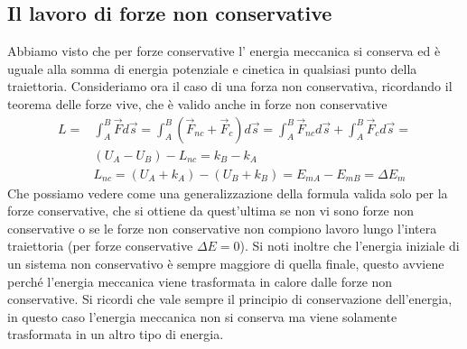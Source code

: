 \subsection{Il lavoro di forze non conservative}
Abbiamo visto che per forze conservative l' energia meccanica si conserva ed è uguale alla somma di energia potenziale e cinetica in qualsiasi punto della traiettoria. Consideriamo ora il caso di una forza non conservativa, ricordando il teorema delle forze vive, che è valido anche in forze non conservative
\begin{align*}
	L =& \int_{A}^{B} \vec{F} d\vec{s} = \int_{A}^{B} (\vec{F}_{nc}+\vec{F}_{c}) d\vec{s} = \int_{A}^{B} \vec{F}_{nc} d\vec{s} + \int_{A}^{B} \vec{F}_{c} d\vec{s} =\\
	&(U_A-U_B)-L_{nc} = k_B-k_A\\
	&L_{nc}=(U_A+ k_{A})-(U_B+k_B)=E_{mA}-E_{mB}=\Delta E_m
\end{align*}
Che possiamo vedere come una generalizzazione della formula valida solo per la forze conservative, che si ottiene da quest'ultima se non vi sono forze non conservative o se le forze non conservative non compiono lavoro lungo l'intera traiettoria (per forze conservative $\Delta E = 0$). Si noti inoltre che l'energia iniziale di un sistema non conservativo è sempre maggiore di quella finale, questo avviene perché l'energia meccanica viene trasformata in calore dalle forze non conservative. Si ricordi che vale sempre il principio di conservazione dell'energia, in questo caso l'energia meccanica non si conserva ma viene solamente trasformata in un altro tipo di energia. 
 
